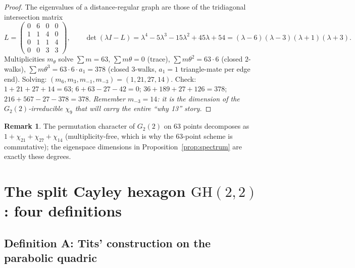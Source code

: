 \documentclass[11pt]{article}
\theoremstyle{definition}
\newtheorem{remark}[theorem]{Remark}
\newcommand{\GH}{\mathrm{GH}}
\begin{document}
\begin{proof}
The eigenvalues of a distance-regular graph are those of the tridiagonal
intersection matrix
\[
L = \begin{pmatrix}
0 & 6 & 0 & 0\\
1 & 1 & 4 & 0\\
0 & 1 & 1 & 4\\
0 & 0 & 3 & 3
\end{pmatrix},
\qquad
\det(\lambda I - L) = \lambda^4 - 5\lambda^3 - 15\lambda^2 + 45\lambda + 54
= (\lambda-6)(\lambda-3)(\lambda+1)(\lambda+3).
\]
Multiplicities $m_\theta$ solve $\sum m = 63$, $\sum m\theta = 0$ (trace),
$\sum m\theta^2 = 63\cdot 6$ (closed $2$-walks),
$\sum m\theta^3 = 63\cdot 6\cdot a_1 = 378$ (closed $3$-walks, $a_1 = 1$
triangle-mate per edge end). Solving: $(m_6,m_3,m_{-1},m_{-3}) =
(1,21,27,14)$. Check: $1+21+27+14=63$; $6+63-27-42=0$;
$36+189+27+126 = 378$; $216 + 567 - 27 - 378 = 378$. \emph{Remember
$m_{-3} = 14$: it is the dimension of the $G_2(2)$-irreducible $\chi_9$ that
will carry the entire ``why 13'' story.}
\end{proof}

\begin{remark}
The permutation character of $G_2(2)$ on $63$ points decomposes as
$1 + \chi_{21} + \chi_{27} + \chi_{14}$ (multiplicity-free, which is why the
$63$-point scheme is commutative); the eigenspace dimensions in
Proposition~\ref{prop:spectrum} are exactly these degrees.
\end{remark}

\section{The split Cayley hexagon $\GH(2,2)$: four definitions}

\subsection{Definition A: Tits' construction on the parabolic quadric}
\end{document}
